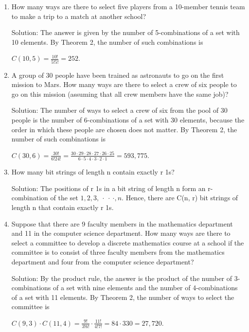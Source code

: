 \documentclass[11pt,a4paper]{book}
\begin{document}
\begin{enumerate}[label=Example~\arabic*]
\item How many ways are there to select five players from a 10-member tennis team to make a trip to a match at another school?

Solution: The answer is given by the number of 5-combinations of a set with 10 elements.
By Theorem 2, the number of such combinations is 

$C(10, 5) = \frac{10!}{5!5!} = 252.$

\item A group of 30 people have been trained as astronauts to go on the first mission to Mars.
How many ways are there to select a crew of six people to go on this mission (assuming that all crew members have the same job)?

Solution: The number of ways to select a crew of six from the pool of 30 people is the number of 6-combinations of a set with 30 elements, because the order in which these people are chosen does not matter.
By Theorem 2, the number of such combinations is 

$C(30, 6) = \frac{30!}{6!24!} = \frac{30 \cdot 29 \cdot 28 \cdot 27 \cdot 26 \cdot 25}{6 \cdot 5 \cdot 4 \cdot 3 \cdot 2 \cdot 1}= 593,775.$

\item How many bit strings of length n contain exactly r 1s?

Solution: The positions of r 1s in a bit string of length n form an r-combination of the set ${1, 2, 3, ~\cdot~\cdot~\cdot , n}$.
Hence, there are C(n, r) bit strings of length n that contain exactly r 1s.

\item Suppose that there are 9 faculty members in the mathematics department and 11 in the computer science department.
How many ways are there to select a committee to develop a discrete mathematics course at a school if the committee is to consist of three faculty members from the mathematics department and four from the computer science department?

Solution: By the product rule, the answer is the product of the number of 3-combinations of a set with nine elements and the number of 4-combinations of a set with 11 elements.
By Theorem 2, the number of ways to select the committee is

$C(9, 3) \cdot C(11, 4) = \frac{9!}{3!6!} \cdot \frac{11!}{4!7!} = 84 \cdot 330 = 27,720.$
\end{enumerate}
\end{document}
